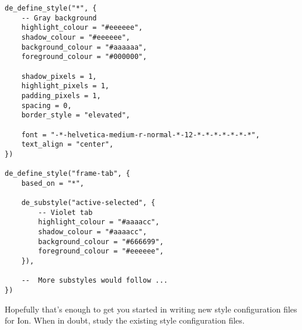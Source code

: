 \begin{verbatim}
de_define_style("*", {
    -- Gray background
    highlight_colour = "#eeeeee",
    shadow_colour = "#eeeeee",
    background_colour = "#aaaaaa",
    foreground_colour = "#000000",
    
    shadow_pixels = 1,
    highlight_pixels = 1,
    padding_pixels = 1,
    spacing = 0,
    border_style = "elevated",
    
    font = "-*-helvetica-medium-r-normal-*-12-*-*-*-*-*-*-*",
    text_align = "center",
})

de_define_style("frame-tab", {
    based_on = "*",
    
    de_substyle("active-selected", {
        -- Violet tab
        highlight_colour = "#aaaacc",
        shadow_colour = "#aaaacc",
        background_colour = "#666699",
        foreground_colour = "#eeeeee",
    }),

    --  More substyles would follow ...
})
\end{verbatim}


Hopefully that's enough to get you started in writing new style
configuration files for Ion. When in doubt, study the existing
style configuration files.

